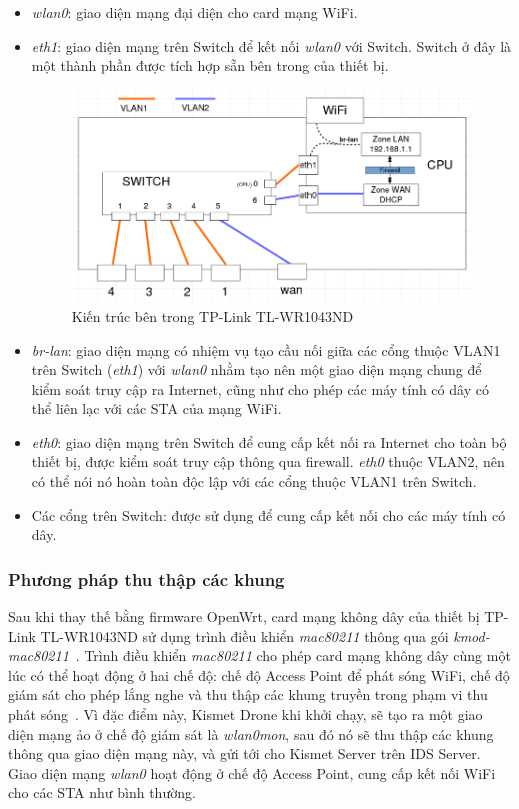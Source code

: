 \begin{itemize}
\item \emph{wlan0}: giao diện mạng đại diện cho card mạng WiFi.
\item \emph{eth1}: giao diện mạng trên Switch để kết nối \emph{wlan0} với Switch. Switch ở đây là một thành phần được tích hợp sẵn bên trong của thiết bị.

\begin{figure}[H]
    \centering
    \includegraphics[width=1.0\textwidth]{tp-link-wr1043nd}
    \caption{
        \label{fig:tp-link-wr1043nd}
        Kiến trúc bên trong TP-Link TL-WR1043ND}
\end{figure}

\item \emph{br-lan}: giao diện mạng có nhiệm vụ tạo cầu nối giữa các cổng thuộc VLAN1 trên Switch (\emph{eth1}) với \emph{wlan0} nhằm tạo nên một giao diện mạng chung để kiểm soát truy cập ra Internet, cũng như cho phép các máy tính có dây có thể liên lạc với các STA của mạng WiFi.
\item \emph{eth0}: giao diện mạng trên Switch để cung cấp kết nối ra Internet cho toàn bộ thiết bị, được kiểm soát truy cập thông qua firewall. \emph{eth0} thuộc VLAN2, nên có thể nói nó hoàn toàn độc lập với các cổng thuộc VLAN1 trên Switch.
\item Các cổng trên Switch: được sử dụng để cung cấp kết nối cho các máy tính có dây.
\end{itemize}

\subsubsection{Phương pháp thu thập các khung}
Sau khi thay thế bằng firmware OpenWrt, card mạng không dây của thiết bị TP-Link TL-WR1043ND sử dụng trình điều khiển \emph{mac80211} thông qua gói \emph{kmod-mac80211}~\cite{openwrt2017wiki}. Trình điều khiển \emph{mac80211} cho phép card mạng không dây cùng một lúc có thể hoạt động ở hai chế độ: chế độ Access Point để phát sóng WiFi, chế độ giám sát cho phép lắng nghe và thu thập các khung truyền trong phạm vi thu phát sóng~\cite{steven2015capturing}. Vì đặc điểm này, Kismet Drone khi khởi chạy, sẽ tạo ra một giao diện mạng ảo ở chế độ giám sát là \emph{wlan0mon}, sau đó nó sẽ thu thập các khung thông qua giao diện mạng này, và gửi tới cho Kismet Server trên IDS Server. Giao diện mạng \emph{wlan0} hoạt động ở chế độ Access Point, cung cấp kết nối WiFi cho các STA như bình thường.

